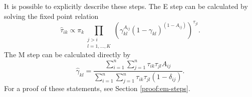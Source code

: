 \documentclass[../../main.tex]{subfiles} %
\begin{document}
It is possible to explicitly describe these steps. The E step can be calculated 
by solving the fixed point relation
\begin{equation}
	\hat \tau_{ik} \propto \pi_k \prod_{\substack{j > i \\ l = 1, \dots, K}}
	\left( \gamma_{kl}^{A_{ij}} \left( 1 - \gamma_{kl} \right)^{\left( 1 -
		A_{ij}
		\right)} \right)^{\tau_{jl}}.
	\label{eq:fixed-point-tau}
\end{equation}
The M step can be calculated directly by
\begin{equation} \label{eq:gamma-hat-proof}
	\hat \gamma_{kl} = \frac{\sum_{i=1}^n \sum_{j=1}^n \tau_{ik}
		\tau_{jl} A_{ij}}{\sum_{i=1}^n \sum_{j=1}^n \tau_{ik} \tau_{jl} \left(
		1 - \delta_{ij} \right)}.
\end{equation}
For a proof of these statements, see Section \ref{proof:em-steps}.
\end{document}

